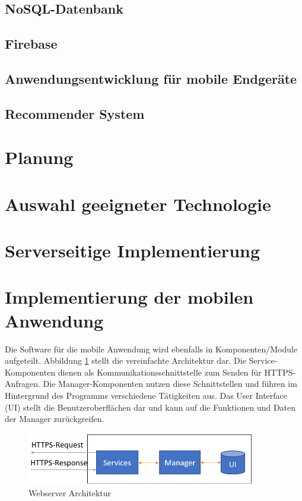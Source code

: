 \documentclass[11pt,a4paper]{article}
\begin{document}
\clearpage
\subsection{NoSQL-Datenbank}

\subsection{Firebase}
\label{sec:firebase}

\subsection{Anwendungsentwicklung für mobile Endgeräte}

\subsection{Recommender System}
\label{sec:recomandationSystem}


\clearpage
\section{Planung}



\clearpage
\section{Auswahl geeigneter Technologie}


\clearpage
\section{Serverseitige Implementierung}


\clearpage
\section{Implementierung der mobilen Anwendung}
Die Software für die mobile Anwendung wird ebenfalls in Komponenten/Module aufgeteilt. Abbildung \ref{fig:AppArchitektur} stellt die vereinfachte Architektur dar. Die Service-Komponenten dienen als Kommunikationsschnittstelle zum Senden für HTTPS-Anfragen. Die  Manager-Komponenten nutzen diese Schnittstellen und führen im Hintergrund des Programms verschiedene Tätigkeiten aus. Das User Interface (UI) stellt die Benutzeroberflächen dar und kann auf die Funktionen und Daten der Manager zurückgreifen.
\begin{figure}[tbt]
\centering
\includegraphics[width=10cm]{images/AppBackend.PNG}
\caption{Webserver Architektur}
\label{fig:AppArchitektur}
\end{figure}
\end{document}
